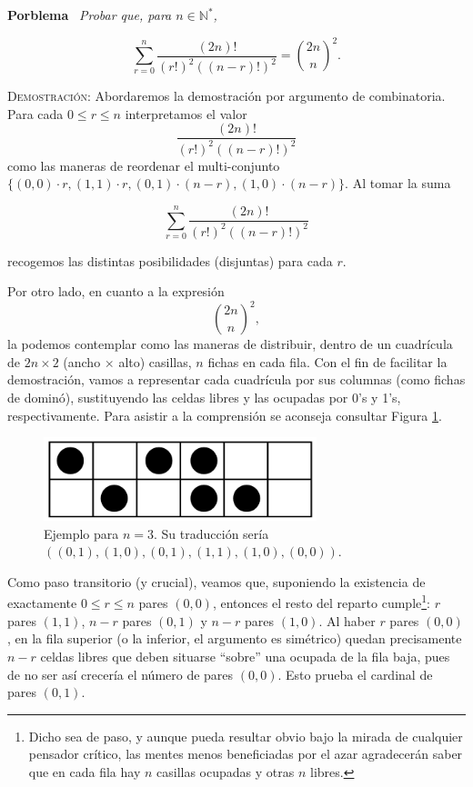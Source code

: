 \documentclass{article}
\begin{document}
\vspace{12px}

\newpage

\noindent\textbf{Porblema} \, \textit{Probar que, para $n \in \mathbb{N}^*$,}

\[\sum_{r=0}^{n} \frac{(2n)!}{(r!)^2((n-r)!)^2} = \binom{2n}{n}^2.\]

\noindent\textsc{Demostración}: Abordaremos la demostración por argumento de combinatoria. Para cada $0 \leq r \leq n$ interpretamos el valor \[\frac{(2n)!}{(r!)^2((n-r)!)^2}\] como las maneras de reordenar el multi-conjunto $\{(0, 0) \cdot r, (1, 1) \cdot r, (0, 1) \cdot (n - r), (1, 0) \cdot (n - r)\}$. Al tomar la suma

\begin{equation}
    \sum_{r=0}^{n}\frac{(2n)!}{(r!)^2((n-r)!)^2}
    \label{eq:eq001}
\end{equation}

\noindent recogemos las distintas posibilidades (disjuntas) para cada $r$.

Por otro lado, en cuanto a la expresión \begin{equation}
\binom{2n}{n}^2,
\label{eq:eq002}
\end{equation} la podemos contemplar como las maneras de distribuir, dentro de un cuadrícula de $2n \times 2$ (ancho $\times$ alto) casillas, $n$ fichas en cada fila.
Con el fin de facilitar la demostración, vamos a representar cada cuadrícula por sus columnas (como fichas de dominó), sustituyendo las celdas libres y las ocupadas por 0's y 1's, respectivamente. Para asistir a la comprensión se aconseja consultar Figura \ref{fig:tiling}.

\begin{figure}[h!]
    \centering
    \includegraphics[width=300px]{tilings.png}
    \caption{Ejemplo para $n = 3$. Su traducción sería $((0, 1), (1, 0), (0, 1), (1, 1), (1, 0), (0, 0))$.}
    \label{fig:tiling}
\end{figure}

Como paso transitorio (y crucial), veamos que, suponiendo la existencia de exactamente $0 \leq r \leq n$ pares $(0, 0)$, entonces el resto del reparto cumple\footnote{Dicho sea de paso, y aunque pueda resultar obvio bajo la mirada de cualquier pensador crítico, las mentes menos beneficiadas por el azar agradecerán saber que en cada fila hay $n$ casillas ocupadas y otras $n$ libres.}: $r$ pares $(1, 1)$, $n - r$ pares $(0, 1)$ y $n - r$ pares $(1, 0)$.
Al haber $r$ pares $(0, 0)$, en la fila superior (o la inferior, el argumento es simétrico) quedan precisamente $n - r$ celdas libres que deben situarse ``sobre'' una ocupada de la fila baja, pues de no ser así crecería el número de pares $(0, 0)$. Esto prueba el cardinal de pares $(0, 1)$.
\end{document}
